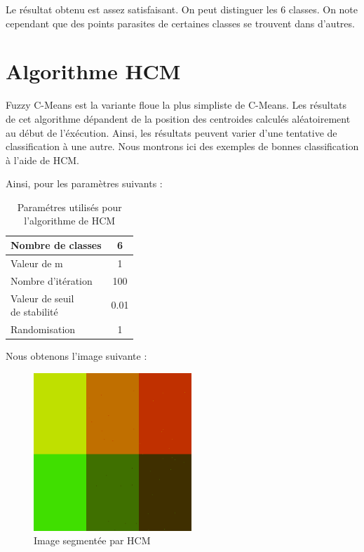 \documentclass[a4paper,11pt]{article}
\begin{document}
Le résultat obtenu est assez satisfaisant. On peut distinguer les 6 classes. On note cependant que des points parasites de certaines classes se trouvent dans d'autres.

\section{Algorithme HCM}
Fuzzy C-Means est la variante floue la plus simpliste de C-Means. Les résultats de cet algorithme dépandent de la position des centroides calculés aléatoirement au début de l'éxécution. Ainsi, les résultats peuvent varier d'une tentative de classification à une autre. Nous montrons ici des exemples de bonnes classification à l'aide de HCM.

Ainsi, pour les paramètres suivants : 

\begin{table}[H]
  \begin{center}
    \begin{tabular}{|l|c|}
      \hline
      Nombre de classes & 6 \\
      \hline
      Valeur de m & 1 \\
      \hline
      Nombre d'itération & 100 \\
      \hline
      \shortstack{ Valeur de seuil \\ de stabilité }  & 0.01 \\
      \hline
      Randomisation & 1 \\
      \hline
    \end{tabular}
    \caption{Paramétres utilisés pour l'algorithme de HCM}
  \end{center}
\end{table}

Nous obtenons l'image suivante :

\begin{figure}[H]
\begin{center}
\includegraphics[width=225px]{../img/HCM.png}
\end{center}
\caption{Image segmentée par HCM}
\end{figure}
\end{document}
